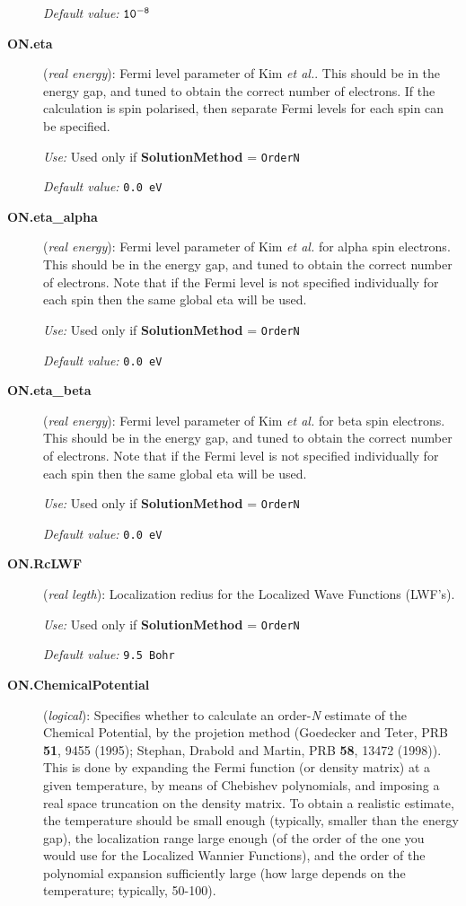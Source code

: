 \documentclass[11pt]{article}
\begin{document}
\begin{description}
{\it Default value:} ${\tt 10^{-8}}$

\item[{\bf ON.eta}] ({\it real energy}): 
Fermi level parameter of Kim 
{\it et al.}. This should be in the energy gap, and tuned to obtain
the correct number of electrons. If the calculation is spin polarised,
then separate Fermi levels for each spin can be specified.

{\it Use:} Used only if {\bf SolutionMethod} = {\tt OrderN}

{\it Default value:} {\tt 0.0 eV}

\item[{\bf ON.eta\_alpha}] ({\it real energy}): 
Fermi level parameter of Kim {\it et al.} for alpha spin electrons. 
This should be in the energy gap, and tuned to obtain
the correct number of electrons. Note that if the Fermi
level is not specified individually for each spin then the
same global eta will be used.

{\it Use:} Used only if {\bf SolutionMethod} = {\tt OrderN}

{\it Default value:} {\tt 0.0 eV}

\item[{\bf ON.eta\_beta}] ({\it real energy}): 
Fermi level parameter of Kim {\it et al.} for beta spin electrons. 
This should be in the energy gap, and tuned to obtain
the correct number of electrons. Note that if the Fermi
level is not specified individually for each spin then the
same global eta will be used.

{\it Use:} Used only if {\bf SolutionMethod} = {\tt OrderN}

{\it Default value:} {\tt 0.0 eV}

\item[{\bf ON.RcLWF}] ({\it real legth}): 
Localization redius for the Localized Wave Functions (LWF's).

{\it Use:} Used only if  {\bf SolutionMethod} = {\tt OrderN}

{\it Default value:} {\tt 9.5 Bohr}
        
\item[{\bf ON.ChemicalPotential}] ({\it logical}): 
Specifies whether to calculate an order-{\it N} estimate of the
Chemical Potential, by the projetion method 
(Goedecker and Teter, PRB {\bf 51}, 9455 (1995); 
Stephan, Drabold and Martin, PRB {\bf 58}, 13472 
(1998)). This is
done by expanding the Fermi function (or density matrix)
at a given temperature, by means of Chebishev
polynomials, and imposing a
real space truncation on the density matrix.
To obtain a realistic estimate, the temperature 
should be small enough (typically, smaller than
the energy gap), the localization range large enough
(of the order of the one you would use for the Localized Wannier
Functions), and the order of the polynomial expansion
sufficiently large (how large depends on the temperature; 
typically, 50-100).


\end{description}
\end{document}

